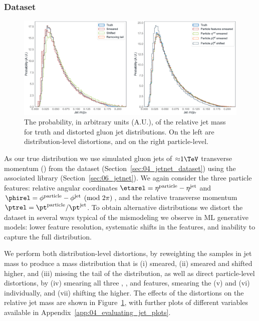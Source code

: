 \subsubsection{Dataset}
\label{sec:04_evaluating_jetdata_dataset}

\begin{figure}[ht]
    \includegraphics[width=\textwidth]{figures/04-ML4Sim/evaluating/jet_mass_dists.pdf}
    \caption{The probability, in arbitrary units (A.U.), of the relative jet mass for truth and distorted gluon jet distributions. 
    On the left are distribution-level distortions, and on the right particle-level.}
    \label{fig:04_evaluating_jetdists} 
\end{figure}

As our true distribution we use simulated gluon jets of ${\approx}1\TeV$ transverse momentum (\pt) from the \jetnet dataset (Section~\ref{sec:04_jetnet_dataset}) using the associated \jetnet library (Section~\ref{sec:06_jetnet}).
We again consider the three particle features: relative angular coordinates 
$\etarel =\eta^{\mathrm{particle}} - \eta^{\mathrm{jet}}$ and 
$\phirel =\phi^{\mathrm{particle}} - \phi^{\mathrm{jet}} \pmod{2\pi}$, and the relative transverse momentum 
$\ptrel = \pt^{\mathrm{particle}}/\pt^{\mathrm{jet}}$.
To obtain alternative distributions we distort the dataset in several ways typical of the mismodeling we observe in ML generative models: lower feature resolution, systematic shifts in the features, and inability to capture the full distribution.

We perform both distribution-level distortions, by reweighting the samples in jet mass to produce a mass distribution that is (i) smeared, (ii) smeared and shifted higher, and (iii) missing the tail of the distribution, as well as direct particle-level distortions, by (iv) smearing all three \phirel, \etarel, and \ptrel features, smearing the (v) \ptrel and (vi) \etarel individually, and (vii) shifting the \ptrel higher. 
The effects of the distortions on the relative jet mass are shown in Figure~\ref{fig:04_evaluating_jetdists}, with further plots of different variables available in Appendix~\ref{app:04_evaluating_jet_plots}.

